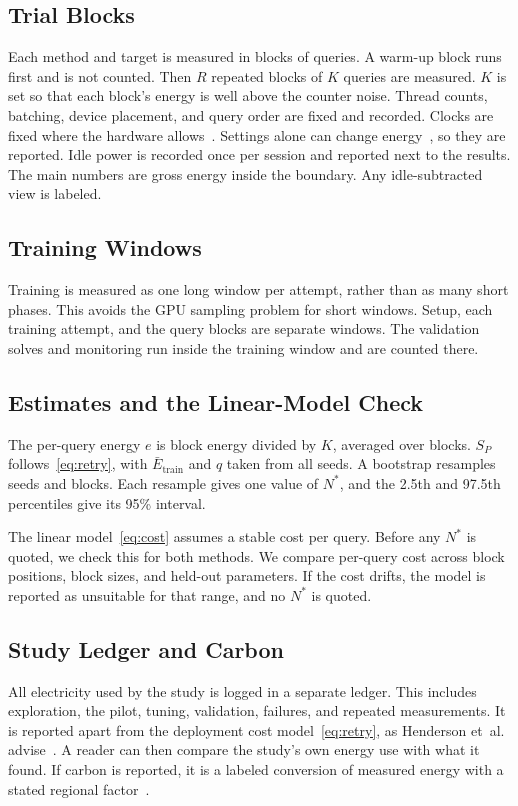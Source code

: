 \documentclass[journal]{IEEEtran}
\newcommand{\Nstar}{N^{\ast}}
\begin{document}
\subsection{Trial Blocks}
Each method and target is measured in blocks of queries. A warm-up block runs first and is not counted. Then $R$ repeated blocks of $K$ queries are measured. $K$ is set so that each block's energy is well above the counter noise. Thread counts, batching, device placement, and query order are fixed and recorded. Clocks are fixed where the hardware allows~\cite{yoo2026,mlperfpower2025}. Settings alone can change energy~\cite{chung2025}, so they are reported. Idle power is recorded once per session and reported next to the results. The main numbers are gross energy inside the boundary. Any idle-subtracted view is labeled.

\subsection{Training Windows}
Training is measured as one long window per attempt, rather than as many short phases. This avoids the GPU sampling problem for short windows. Setup, each training attempt, and the query blocks are separate windows. The validation solves and monitoring run inside the training window and are counted there.

\subsection{Estimates and the Linear-Model Check}
The per-query energy $e$ is block energy divided by $K$, averaged over blocks. $S_P$ follows~\eqref{eq:retry}, with $\bar E_{\mathrm{train}}$ and $q$ taken from all seeds. A bootstrap resamples seeds and blocks. Each resample gives one value of $\Nstar$, and the 2.5th and 97.5th percentiles give its 95\% interval.

The linear model~\eqref{eq:cost} assumes a stable cost per query. Before any $\Nstar$ is quoted, we check this for both methods. We compare per-query cost across block positions, block sizes, and held-out parameters. If the cost drifts, the model is reported as unsuitable for that range, and no $\Nstar$ is quoted.

\subsection{Study Ledger and Carbon}
All electricity used by the study is logged in a separate ledger. This includes exploration, the pilot, tuning, validation, failures, and repeated measurements. It is reported apart from the deployment cost model~\eqref{eq:retry}, as Henderson et~al. advise~\cite{henderson2020}. A reader can then compare the study's own energy use with what it found. If carbon is reported, it is a labeled conversion of measured energy with a stated regional factor~\cite{dodge2022}.
\end{document}
